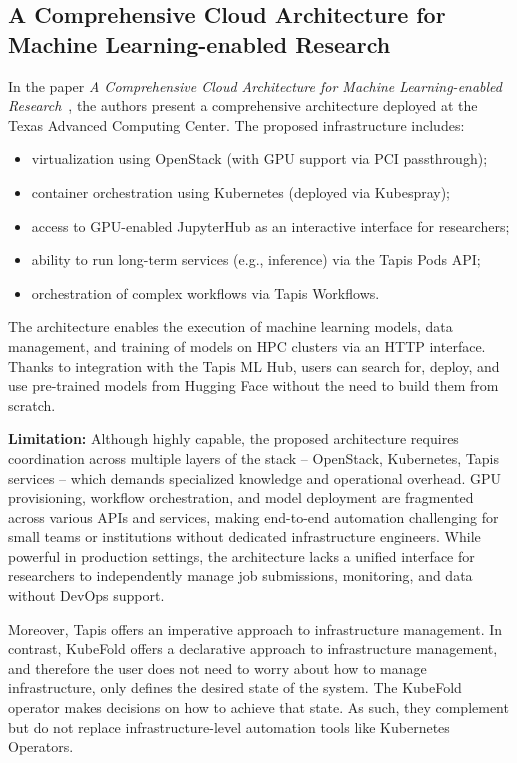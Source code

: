 \subsection{A Comprehensive Cloud Architecture for Machine Learning-enabled Research}

In the paper \textit{A Comprehensive Cloud Architecture for Machine Learning-enabled Research}~\cite{cloud_architecture_for_research}, the authors present a comprehensive architecture deployed at the Texas Advanced Computing Center.
The proposed infrastructure includes:
\begin{itemize}
    \item virtualization using OpenStack (with GPU support via PCI passthrough);
    \item container orchestration using Kubernetes (deployed via Kubespray);
    \item access to GPU-enabled JupyterHub as an interactive interface for researchers;
    \item ability to run long-term services (e.g., inference) via the Tapis Pods API;
    \item orchestration of complex workflows via Tapis Workflows.
\end{itemize}

The architecture enables the execution of machine learning models, data management, and training of models on HPC clusters via an HTTP interface.
Thanks to integration with the Tapis ML Hub, users can search for, deploy, and use pre-trained models from Hugging Face without the need to build them from scratch.

\textbf{Limitation:} Although highly capable, the proposed architecture requires coordination across multiple layers of the stack -- OpenStack, Kubernetes, Tapis services -- which demands specialized knowledge and operational overhead.
GPU provisioning, workflow orchestration, and model deployment are fragmented across various APIs and services, making end-to-end automation challenging for small teams or institutions without dedicated infrastructure engineers.
While powerful in production settings, the architecture lacks a unified interface for researchers to independently manage job submissions, monitoring, and data without DevOps support.

Moreover, Tapis offers an imperative approach to infrastructure management. In contrast, KubeFold offers a declarative approach to infrastructure management, and therefore the user does not need to worry about how to manage infrastructure, only defines the desired state of the system. The KubeFold operator makes decisions on how to achieve that state.
As such, they complement but do not replace infrastructure-level automation tools like Kubernetes Operators.

